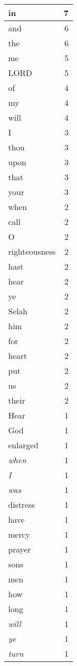 \begin{center}
\begin{longtable}{l|r}
\hline \hline
\endlastfoot
in & 7 \\ \hline
and & 6 \\ \hline
the & 6 \\ \hline
me & 5 \\ \hline
LORD & 5 \\ \hline
of & 4 \\ \hline
my & 4 \\ \hline
will & 4 \\ \hline
I & 3 \\ \hline
thou & 3 \\ \hline
upon & 3 \\ \hline
that & 3 \\ \hline
your & 3 \\ \hline
when & 2 \\ \hline
call & 2 \\ \hline
O & 2 \\ \hline
righteousness & 2 \\ \hline
hast & 2 \\ \hline
hear & 2 \\ \hline
ye & 2 \\ \hline
Selah & 2 \\ \hline
him & 2 \\ \hline
for & 2 \\ \hline
heart & 2 \\ \hline
put & 2 \\ \hline
us & 2 \\ \hline
their & 2 \\ \hline
Hear & 1 \\ \hline
God & 1 \\ \hline
enlarged & 1 \\ \hline
\emph{when} & 1 \\ \hline
\emph{I} & 1 \\ \hline
\emph{was} & 1 \\ \hline
distress & 1 \\ \hline
have & 1 \\ \hline
mercy & 1 \\ \hline
prayer & 1 \\ \hline
sons & 1 \\ \hline
men & 1 \\ \hline
how & 1 \\ \hline
long & 1 \\ \hline
\emph{will} & 1 \\ \hline
\emph{ye} & 1 \\ \hline
\emph{turn} & 1 \\ \hline

\end{longtable}
\end{center}
